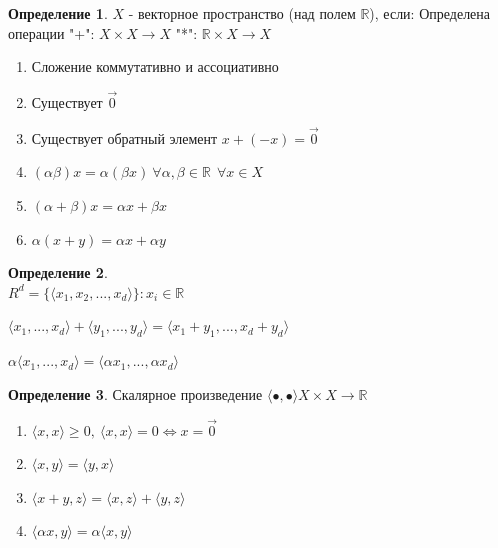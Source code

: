 \documentclass[12pt,letterpaper]{report}
\theoremstyle{definition}
\newtheorem*{conj}{Определение}
\begin{document}
    \begin{conj}
        $X$ - векторное пространство (над полем $\mathbb{R}$), если:
        Определена операции "+": $X\times X \to X$
        "*": $\mathbb{R}\times X \to X$ \\
        \begin{enumerate}
            \item Сложение коммутативно и ассоциативно
            \item Существует $\overrightarrow{0}$
            \item Существует обратный элемент $x+(-x)=\overrightarrow{0}$
            \item $(\alpha \beta)x = \alpha(\beta x)\ \forall \alpha, \beta \in \mathbb{R}\ \ \forall x\in X$
            \item $(\alpha+\beta)x = \alpha x + \beta x$
            \item $\alpha(x+y) = \alpha x + \alpha y$
        \end{enumerate}
    \end{conj}
    \vspace*{0,5cm}

    \begin{conj}
        \quad \\
        $R^d = \{ \langle x_1, x_2,...,x_d\rangle  \}: x_i \in \mathbb{R}$
    
        $\langle x_1,...,x_d\rangle +\langle y_1,...,y_d\rangle =\langle x_1+y_1,..., x_d + y_d\rangle $
    
        $\alpha \langle x_1,...,x_d\rangle  = \langle \alpha x_1,..., \alpha x_d\rangle $
    \end{conj}
    
    \begin{conj}
        Скалярное произведение $\langle \bullet, \bullet\rangle X\times X \to \mathbb{R}$
    
        \begin{enumerate}
            \item $\langle x, x\rangle \geq 0,\ \langle x, x\rangle =0 \Longleftrightarrow x=\overrightarrow{0}$
            \item $\langle x, y\rangle = \langle y, x\rangle$
            \item $\langle x+y, z\rangle = \langle x, z\rangle + \langle y, z \rangle $
            \item $\langle \alpha x, y\rangle = \alpha \langle x, y \rangle $
        \end{enumerate}
    \end{conj}
    
\end{document}
